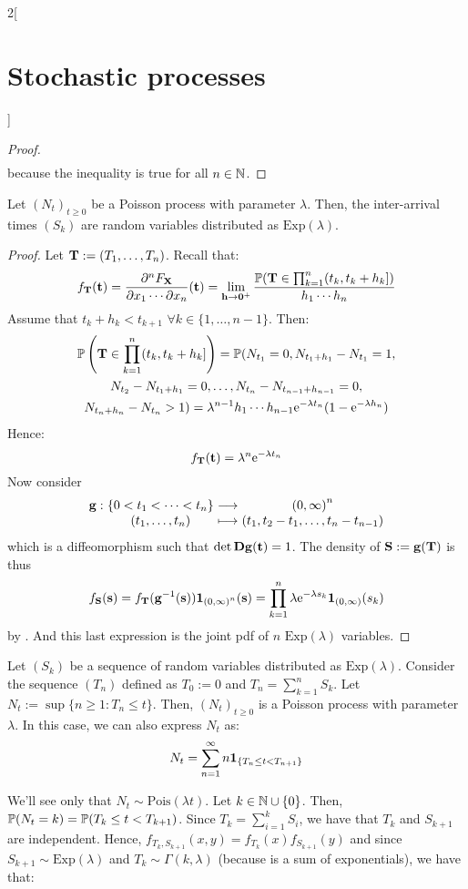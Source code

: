 \documentclass[../../../main_math.tex]{subfiles}
\begin{document}
\begin{multicols}{2}[\section{Stochastic processes}]
\begin{proof}
\begin{multline*}
    \end{multline*}
    because the inequality is true for all $n\in\mathbb{N}$.
  \end{proof}
  \begin{theorem}
    Let ${(N_t)}_{t\geq 0}$ be a Poisson process with parameter $\lambda$. Then, the inter-arrival times $(S_k)$ are \iid random variables distributed as $\text{Exp}(\lambda)$.
  \end{theorem}
  \begin{proof}
    Let $\boldsymbol{\mathrm{T}}:=(T_1,\ldots,T_n)$. Recall that:
    $$
      f_{\boldsymbol{\mathrm{T}}}(\boldsymbol{\mathrm{t}})=\frac{\partial^nF_{\boldsymbol{\mathrm{X}}}}{\partial x_1\cdots\partial x_n}(\boldsymbol{\mathrm{t}})=\lim_{\boldsymbol{\mathrm{h}}\to \boldsymbol{\mathrm{0}}^+}\frac{\mathbb{P}(\boldsymbol{\mathrm{T}}\in \prod_{k=1}^n(t_k,t_k+h_k])}{h_1\cdots h_n}
    $$
    Assume that $t_k+h_k<t_{k+1}$ $\forall k\in\{1,\ldots,n-1\}$. Then:
    \begin{multline*}
      \mathbb{P}\left(\boldsymbol{\mathrm{T}}\in \prod_{k=1}^n(t_k,t_k+h_k]\right)=\mathbb{P}(N_{t_1}=0, N_{t_1+h_1}-N_{t_1}=1, \\ N_{t_2}-N_{t_1+h_1}=0,\ldots,N_{t_{n}}-N_{t_{n-1}+h_{n-1}}=0,\\N_{t_n+h_n}-N_{t_n}>1)=\lambda^{n-1}h_1\cdots h_{n-1}\mathrm{e}^{-\lambda t_n}(1-\mathrm{e}^{-\lambda h_n})
    \end{multline*}
    Hence:
    $$
      f_{\boldsymbol{\mathrm{T}}}(\boldsymbol{\mathrm{t}})=\lambda^{n}\mathrm{e}^{-\lambda t_n}
    $$
    Now consider
    $$
      \function{\vf{g}}{\{0<t_1<\cdots<t_n\}}{{(0,\infty)}^n}{(t_1,\ldots,t_n)}{(t_1,t_2-t_1,\ldots,t_n-t_{n-1})}
    $$
    which is a diffeomorphism such that $\det \boldsymbol{\mathrm{Dg}}(\boldsymbol{\mathrm{t}})=1$. The density of $\boldsymbol{\mathrm{S}}:=\boldsymbol{\mathrm{g}}(\boldsymbol{\mathrm{T}})$ is thus
    $$
      f_{\boldsymbol{\mathrm{S}}}(\boldsymbol{\mathrm{s}})=f_{\boldsymbol{\mathrm{T}}}(\boldsymbol{\mathrm{g}}^{-1}(\boldsymbol{\mathrm{s}}))\boldsymbol{\mathrm{1}}_{{(0,\infty)}^n}(\boldsymbol{\mathrm{s}})=\prod_{k= 1}^n \lambda \mathrm{e}^{-\lambda s_k}\boldsymbol{\mathrm{1}}_{(0,\infty)}(s_k)
    $$
    by . And this last expression is the joint pdf of $n$ \iid $\text{Exp}(\lambda)$ variables.
  \end{proof}
  \begin{theorem}
    Let ${(S_k)}$ be a sequence of \iid random variables distributed as $\text{Exp}(\lambda)$. Consider the sequence $(T_n)$ defined as $T_0:=0$ and $T_n=\sum_{k=1}^{n}S_k$. Let $N_t:=\sup\{n\geq 1:T_n\leq t\}$. Then, ${(N_t)}_{t\geq 0}$ is a Poisson process with parameter $\lambda$. In this case, we can also express $N_t$ as:
    $$
      N_t=\sum_{n=1}^\infty n \boldsymbol{\mathrm{1}}_{\{T_n\leq t<T_{n+1}\}}
    $$
  \end{theorem}
  \begin{sproof}
    We'll see only that $N_t\sim \text{Pois}(\lambda t)$. Let $k\in\mathbb{N}\cup \{0\}$. Then, $\mathbb{P}(N_t=k)=\mathbb{P}(T_k\leq t<T_{k+1})$. Since $T_k=\sum_{i=1}^k S_i$, we have that $T_{k}$ and $S_{k+1}$ are independent. Hence, $f_{T_k,S_{k+1}}(x,y)=f_{T_k}(x)f_{S_{k+1}}(y)$ and since $S_{k+1}\sim \text{Exp}(\lambda)$ and $T_k\sim \Gamma(k,\lambda)$ (because is a sum of exponentials), we have that:

\end{sproof}
\end{multicols}
\end{document}

